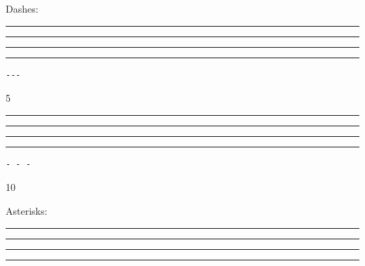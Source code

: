 
\def\mytitle{Horizontal Rules}


Dashes:

\begin{center}\rule{3in}{0.4pt}\end{center}

\begin{center}\rule{3in}{0.4pt}\end{center}

\begin{center}\rule{3in}{0.4pt}\end{center}

\begin{center}\rule{3in}{0.4pt}\end{center}

\begin{verbatim}
---
\end{verbatim}

5

\begin{center}\rule{3in}{0.4pt}\end{center}

\begin{center}\rule{3in}{0.4pt}\end{center}

\begin{center}\rule{3in}{0.4pt}\end{center}

\begin{center}\rule{3in}{0.4pt}\end{center}

\begin{verbatim}
- - -
\end{verbatim}

10

Asterisks:

\begin{center}\rule{3in}{0.4pt}\end{center}

\begin{center}\rule{3in}{0.4pt}\end{center}

\begin{center}\rule{3in}{0.4pt}\end{center}

\begin{center}\rule{3in}{0.4pt}\end{center}

